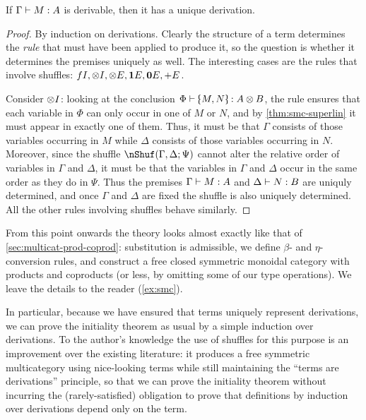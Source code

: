 \begin{lem}\label{thm:smc-tad}
  If $\Gamma\vdash M:A$ is derivable, then it has a unique derivation.
\end{lem}
\begin{proof}
  By induction on derivations.
  Clearly the structure of a term determines the \emph{rule} that must have been applied to produce it, so the question is whether it determines the premises uniquely as well.
  The interesting cases are the rules that involve shuffles: $fI,\mathord{\otimes}I,\mathord{\otimes}E,\mathbf{1} E,\mathbf{0} E,\mathord{+}E$.

  Consider $\mathord{\otimes}I$: looking at the conclusion $\Phi \types \tpair M N : A \tensor B$, the rule ensures that each variable in $\Phi$ can only occur in one of $M$ or $N$, and by \cref{thm:smc-superlin} it must appear in exactly one of them.
  Thus, it must be that $\Gamma$ consists of those variables occurring in $M$ while $\Delta$ consists of those variables occurring in $N$.
  Moreover, since the shuffle $\nShuf(\Gamma,\Delta;\Psi)$ cannot alter the relative order of variables in $\Gamma$ and $\Delta$, it must be that the variables in $\Gamma$ and $\Delta$ occur in the same order as they do in $\Psi$.
  Thus the premises $\Gamma\vdash M:A$ and $\Delta\vdash N:B$ are uniquly determined, and once $\Gamma$ and $\Delta$ are fixed the shuffle is also uniquely determined.
  All the other rules involving shuffles behave similarly.
\end{proof}

From this point onwards the theory looks almost exactly like that of \cref{sec:multicat-prod-coprod}: substitution is admissible, we define $\beta$- and $\eta$-conversion rules, and construct a free closed symmetric monoidal category with products and coproducts (or less, by omitting some of our type operations).
We leave the details to the reader (\cref{ex:smc}).

In particular, because we have ensured that terms uniquely represent derivations, we can prove the initiality theorem as usual by a simple induction over derivations.
To the author's knowledge the use of shuffles for this purpose is an improvement over the existing literature: it produces a free symmetric multicategory using nice-looking terms while still maintaining the ``terms are derivations'' principle, so that we can prove the initiality theorem without incurring the (rarely-satisfied) obligation to prove that definitions by induction over derivations depend only on the term.

